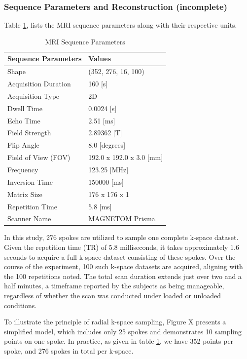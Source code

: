 \documentclass{micro-econ-thesis}
\begin{document}
\subsubsection{Sequence Parameters and Reconstruction (incomplete)}
Table \ref{tab:mri_seq_params}, lists the MRI sequence parameters along with their respective units.

\begin{table}[H]
	\centering
	\label{tab:mri_seq_params}
	\caption{MRI Sequence Parameters}
	\begin{tabular}{@{}ll@{}}
		\toprule
		Sequence Parameters & Values \\ \midrule
		Shape & (352, 276, 16, 100) \\
		Acquisition Duration & 160 [s] \\
		Acquisition Type & 2D \\
		Dwell Time & 0.0024 [s] \\
		Echo Time & 2.51 [ms] \\
		Field Strength & 2.89362 [T] \\
		Flip Angle & 8.0 [degrees] \\
		Field of View (FOV) & 192.0 x 192.0 x 3.0 [mm] \\
		Frequency & 123.25 [MHz] \\
		Inversion Time & 150000 [ms] \\
		Matrix Size & 176 x 176 x 1 \\
		Repetition Time & 5.8 [ms] \\
		Scanner Name & MAGNETOM Prisma \\
		\bottomrule
	\end{tabular}
\end{table}

In this study, 276 spokes are utilized to sample one complete k-space dataset. Given the repetition time (TR) of 5.8 milliseconds, it takes approximately 1.6 seconds to acquire a full k-space dataset consisting of these spokes. Over the course of the experiment, 100 such k-space datasets are acquired, aligning with the 100 repetitions noted. The total scan duration extends just over two and a half minutes, a timeframe reported by the subjects as being manageable, regardless of whether the scan was conducted under loaded or unloaded conditions.

To illustrate the principle of radial k-space sampling, Figure X presents a simplified model, which includes only 25 spokes and demonstrates 10 sampling points on one spoke. In practice, as given in table \ref{tab:mri_seq_params}, we have 352 points per spoke, and 276 spokes in total per k-space. 
\end{document}
